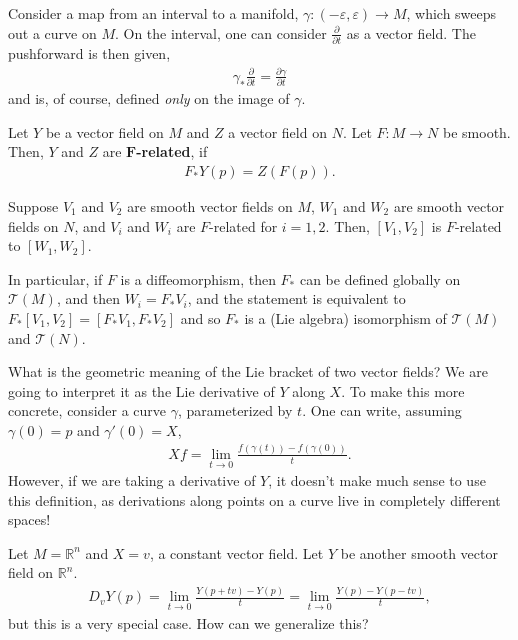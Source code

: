 \documentclass{../mathnotes}
\begin{document}
\begin{exmp}
    Consider a map from an interval to a manifold, $\gamma:(-\varepsilon,\varepsilon)\to M$, which sweeps out a curve on $M$. On the interval,
    one can consider $\frac{\partial}{\partial t}$ as a vector field. The pushforward is then given,
    \begin{align*}
        \gamma_*\frac{\partial}{\partial t}=\frac{\partial \gamma}{\partial t}
    \end{align*}
    and is, of course, defined \textit{only} on the image of $\gamma$.
\end{exmp}

\begin{defn}
    Let $Y$ be a vector field on $M$ and $Z$ a vector field on $N$. Let $F:M\to N$ be smooth. Then, $Y$ and $Z$ are \textbf{$\mathbf{F}$-related}, if
    \begin{align*}
        F_*Y(p)=Z(F(p)).
    \end{align*}
\end{defn}

\begin{thm}
    Suppose $V_1$ and $V_2$ are smooth vector fields on $M$, $W_1$ and $W_2$ are smooth vector fields on $N$, and $V_i$ and $W_i$ are $F$-related
    for $i=1,2$. Then, $[V_1,V_2]$ is $F$-related to $[W_1,W_2]$.

    In particular, if $F$ is a diffeomorphism, then $F_*$ can be defined globally on $\mathcal{T}(M)$, and then $W_i=F_* V_i$, and the statement is
    equivalent to $F_*[V_1,V_2]=[F_*V_1,F_*V_2]$ and so $F_*$ is a (Lie algebra) isomorphism of $\mathcal{T}(M)$ and $\mathcal{T}(N)$.
\end{thm}

What is the geometric meaning of the Lie bracket of two vector fields? We are going to interpret it as the Lie derivative of $Y$ along $X$.
To make this more concrete, consider a curve $\gamma$, parameterized by $t$. One can write, assuming $\gamma(0)=p$ and $\gamma'(0)=X$,
\begin{align*}
    Xf=\lim_{t\to0}\frac{f(\gamma(t))-f(\gamma(0))}{t}.
\end{align*}
However, if we are taking a derivative of $Y$, it doesn't make much sense to use this definition, as derivations along points on a curve live
in completely different spaces!

\begin{exmp}
    Let $M=\mathbb{R}^n$ and $X=v$, a constant vector field. Let $Y$ be another smooth vector field on $\mathbb{R}^n$.
    \begin{align*}
        D_vY(p)=\lim_{t\to0}\frac{Y(p+tv)-Y(p)}{t}=\lim_{t\to0}\frac{Y(p)-Y\left( p-tv \right)}{t},
    \end{align*}
    but this is a very special case. How can we generalize this?
\end{exmp}
\end{document}
